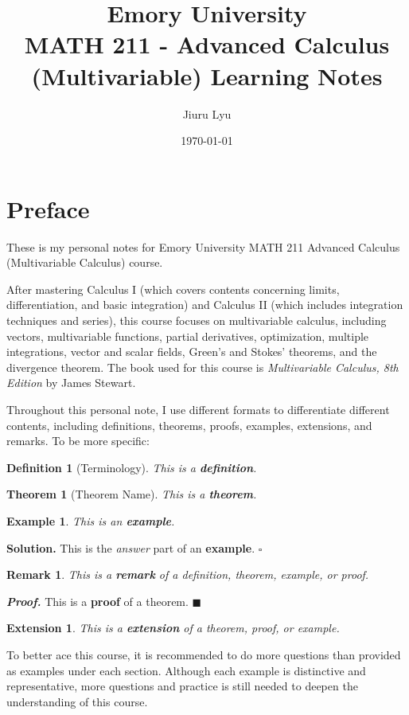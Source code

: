 \documentclass[12pt,a4paper]{article}
\title{Emory University\\\textbf{MATH 211 - Advanced Calculus (Multivariable) Learning Notes}}
\author{Jiuru Lyu}
\date{\today}
\newtheorem{thm}{Theorem}[subsection]
\newtheorem{df}{Definition}[subsection]
\newtheorem{eg}{Example}[subsection]
\newenvironment*{sol}{\indent\textbf{Solution. }}{\hfill{$\square$}\par}
\newtheorem*{rmk}{\indent Remark}
\newenvironment*{prf}{\indent\textbf{\textit{Proof. }}}{\hfill $\blacksquare$\par}
\newtheorem*{ext}{\indent Extension}
\begin{document}
\maketitle
\tableofcontents
\newpage

\section*{Preface}
These is my personal notes for Emory University MATH 211 Advanced Calculus (Multivariable Calculus) course. 

After mastering Calculus I (which covers contents concerning limits, differentiation, and basic integration) and Calculus II (which includes integration techniques and series), this course focuses on multivariable calculus, including vectors, multivariable functions, partial derivatives, optimization, multiple integrations, vector and scalar fields, Green’s and Stokes’ theorems, and the divergence theorem. The book used for this course is \textit{Multivariable Calculus, 8th Edition} by James Stewart. 

Throughout this personal note, I use different formats to differentiate different contents, including definitions, theorems, proofs, examples, extensions, and remarks. To be more specific: 
\begin{df}[Terminology]
    This is a \textbf{definition}.	
\end{df}
\begin{thm}[Theorem Name]
    This is a \textbf{theorem}.	
\end{thm}
\begin{eg}
    This is  an \textbf{example}. 
\end{eg}

\begin{sol}
    This is the \textit{answer} part of an \textbf{example}. 
\end{sol}
\begin{rmk}
	This is a \textbf{remark} of a definition, theorem, example, or proof. 
\end{rmk}

\begin{prf}
	This is a \textbf{proof} of a theorem. 
\end{prf}
\begin{ext}
	This is a \textbf{extension} of a theorem, proof, or example. 	
\end{ext}
To better ace this course, it is recommended to do more questions than provided as examples under each section. Although each example is distinctive and representative, more questions and practice is still needed to deepen the understanding of this course. 
\end{document}
